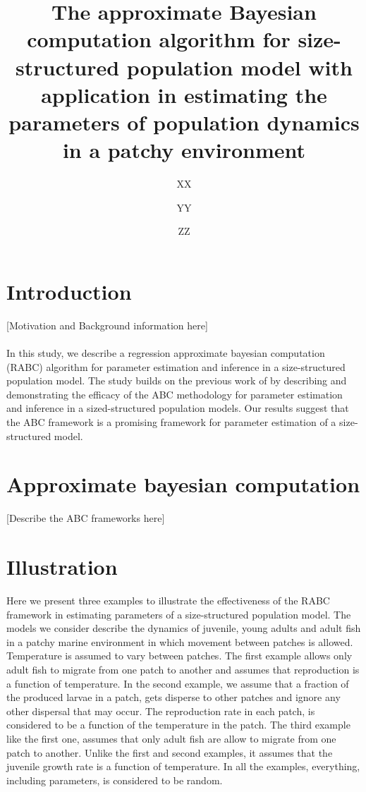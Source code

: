 \documentclass[12pt, table]{article}
\title{\textbf{ The approximate Bayesian computation algorithm for  size-structured population model  with application in estimating the parameters of population dynamics in a patchy environment} 
}
\author[1]{XX}
\author[1]{YY}
\author[1]{ZZ}
\affil[1]{Department of Ecology, Evolution, and Natural Resources, Rutgers University }
\begin{document}
\maketitle
\begin{abstract}
\end{abstract}
\section{Introduction}

[Motivation and Background information here]\\\\
In this study, we describe a regression approximate  bayesian computation (RABC) algorithm  for parameter estimation and inference in a size-structured  population model. The study builds on the previous work of \citep{beaumont2002approximate, beaumont2010approximate, bertorelle2010abc} by describing and demonstrating the efficacy of the  ABC methodology for parameter estimation and inference in a sized-structured population models. Our results suggest that the ABC framework is a promising framework for  parameter estimation of a size-structured model. 

\section{Approximate bayesian computation}
[Describe the ABC frameworks here]

\section{Illustration}
 Here we present three examples to illustrate the effectiveness of the RABC framework in estimating parameters of a size-structured population model.  The models we consider describe the dynamics of juvenile, young adults and adult fish in a patchy marine environment in which movement  between patches is allowed.  Temperature is assumed to vary between patches.  The first example allows only adult fish to migrate from one patch to another and assumes that reproduction is a function of temperature.  In the  second example, we assume that a fraction of the produced larvae in a patch, gets disperse to other patches and ignore any other dispersal that may occur.  The reproduction rate in each patch, is considered to be a function of the temperature in the patch.  The third example like the first one, assumes that  only adult fish are allow to migrate from one patch to another. Unlike the first  and second examples, it assumes that the juvenile growth rate is a function of temperature. In all the examples, everything, including parameters, is considered to be random.
 
\end{document}
